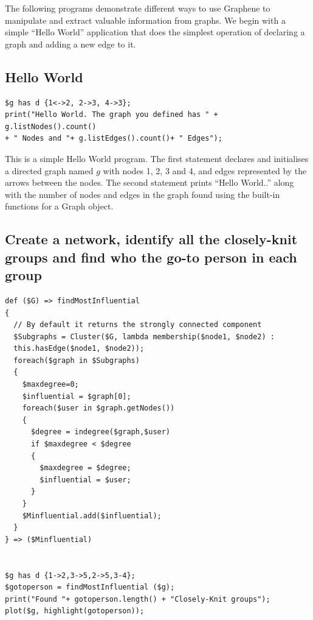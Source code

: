 \documentclass[a4paper]{article}
\begin{document}
The following programs demonstrate different ways to use Graphene to manipulate and extract valuable information from graphs. We begin with a simple “Hello World” application that does the simplest operation of declaring a graph and adding a new edge to it.

\subsection{Hello World}

\begin{verbatim}
$g has d {1<->2, 2->3, 4->3};
print("Hello World. The graph you defined has " + g.listNodes().count()
+ " Nodes and "+ g.listEdges().count()+ " Edges");
\end{verbatim}

\noindent This is a simple Hello World program. The first statement declares and initialises a directed graph named $g$ with nodes 1, 2, 3 and 4, and edges represented by the arrows between the nodes. The second statement prints “Hello World..” along with the number of nodes and edges in the graph found using the built-in functions for a Graph object.
\newline

\subsection{Create a network, identify all the closely-knit groups and find who the go-to person in each group}

\begin{verbatim}
def ($G) => findMostInfluential
{ 
  // By default it returns the strongly connected component 
  $Subgraphs = Cluster($G, lambda membership($node1, $node2) :
  this.hasEdge($node1, $node2));
  foreach($graph in $Subgraphs) 
  {
    $maxdegree=0; 
    $influential = $graph[0]; 
    foreach($user in $graph.getNodes())
    { 
      $degree = indegree($graph,$user) 
      if $maxdegree < $degree
      {
        $maxdegree = $degree; 
        $influential = $user; 
      } 
    } 
    $Minfluential.add($influential); 
  }
} => ($Minfluential) 


$g has d {1->2,3->5,2->5,3-4}; 
$gotoperson = findMostInfluential ($g); 
print("Found "+ gotoperson.length() + "Closely-Knit groups"); 
plot($g, highlight(gotoperson));
\end{verbatim}
\end{document}
